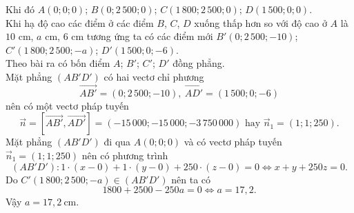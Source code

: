 \begin{bt}
{		Khi đó $A(0;0;0)$; $B(0;2\,500;0)$; $C(1\,800;2\,500;0)$; $D(1\,500;0;0)$.\\ 
		Khi hạ độ  cao các điểm ở các điểm $B$, $C$, $D$ xuống thấp hơn so với độ cao ở $A$ là $10$ cm, $a$ cm, $6$ cm tương ứng ta có các điểm mới $B'(0;2\,500;-10)$; $C'(1\,800;2\,500;-a)$; $D'(1\,500;0;-6)$.\\ Theo bài ra có bốn điểm $A $; $ B' $; $ C' $; $ D'$ đồng phẳng.\\Mặt phẳng $\left(A B' D'\right)$ có hai vectơ chỉ phương $$\overrightarrow{AB'}=(0;2\,500;-10),~ \overrightarrow{AD'}=(1\,500;0;-6)$$ nên có một vectơ pháp tuyến $$\overrightarrow{n}=\left[\overrightarrow{AB'},\overrightarrow{AD'}\right]=(-15\,000;-15\,000;-3\,750\,000)\text{ hay }\overrightarrow{n}_1= (1;1;250).$$
		Mặt phẳng $\left(A B' D'\right)$ đi qua $A(0;0;0)$ và có vectơ pháp tuyến $\overrightarrow{n}_1=(1;1;250)$ nên có phương  trình $$\left(A B' D'\right)\colon 1\cdot (x-0)+1\cdot (y-0)+250\cdot (z-0)=0\Leftrightarrow x+y+250z=0.$$
		Do $C'(1\,800;2\,500;-a) \in\left(AB'D'\right)$ nên ta có $$1800+2500-250 a=0 \Leftrightarrow  a=17{,}2.$$
		Vậy $a=17{,}2  \mathrm{~cm}$.
	 }
\end{bt}

